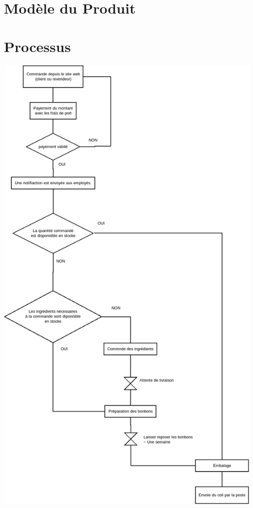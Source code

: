 \documentclass{article}
\begin{document}
\section{Modèle du Produit}

\section{Processus}
\includegraphics[scale=0.4]{../processus_de_commande.png} 
\end{document}
